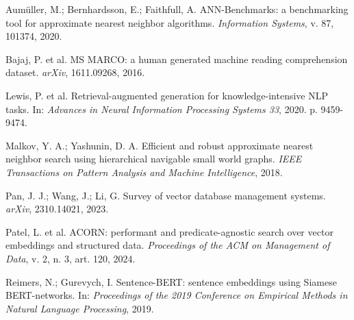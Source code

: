 \documentclass[12pt,a4paper]{article}
\newcommand{\secao}[1]{%
  \par\vspace{6pt}%
  \noindent{\fontsize{12}{14}\selectfont\bfseries #1}\par\vspace{2pt}%
}
\newcommand{\corpo}{\fontsize{10}{12}\selectfont}
\begin{document}
\secao{REFERÊNCIAS}
\corpo
\begingroup
\setlength{\parindent}{0pt}
\raggedright

Aumüller, M.; Bernhardsson, E.; Faithfull, A. ANN-Benchmarks: a benchmarking tool for approximate nearest neighbor algorithms. \textit{Information Systems}, v. 87, 101374, 2020.
\par\vspace{3pt}
Bajaj, P. et al. MS MARCO: a human generated machine reading comprehension dataset. \textit{arXiv}, 1611.09268, 2016.
\par\vspace{3pt}
Lewis, P. et al. Retrieval-augmented generation for knowledge-intensive NLP tasks. In: \textit{Advances in Neural Information Processing Systems 33}, 2020. p. 9459-9474.
\par\vspace{3pt}
Malkov, Y. A.; Yashunin, D. A. Efficient and robust approximate nearest neighbor search using hierarchical navigable small world graphs. \textit{IEEE Transactions on Pattern Analysis and Machine Intelligence}, 2018.
\par\vspace{3pt}
Pan, J. J.; Wang, J.; Li, G. Survey of vector database management systems. \textit{arXiv}, 2310.14021, 2023.
\par\vspace{3pt}
Patel, L. et al. ACORN: performant and predicate-agnostic search over vector embeddings and structured data. \textit{Proceedings of the ACM on Management of Data}, v. 2, n. 3, art. 120, 2024.
\par\vspace{3pt}
Reimers, N.; Gurevych, I. Sentence-BERT: sentence embeddings using Siamese BERT-networks. In: \textit{Proceedings of the 2019 Conference on Empirical Methods in Natural Language Processing}, 2019.

\endgroup

\vspace{6pt}
\end{document}
